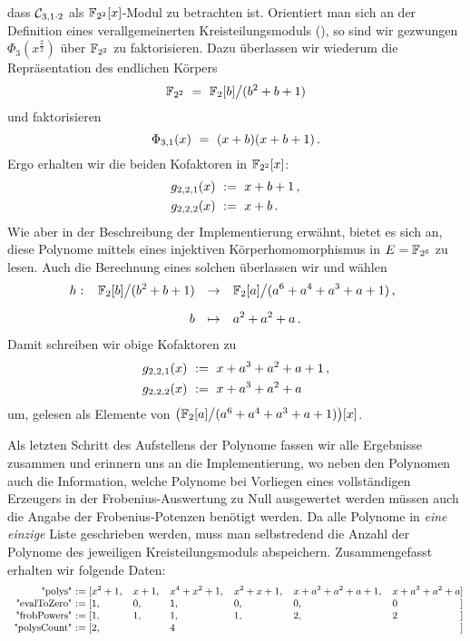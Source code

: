 \begin{enumerate}
\begin{description}
        dass $\mathcal{C}_{3,1\cdot 2}$ als $\mathbb{F}_{2^2}[x]$-Modul zu betrachten
        ist. Orientiert man sich an der Definition eines verallgemeinerten
        Kreisteilungsmoduls (),
        so sind wir gezwungen $\Phi_3(x^{\frac{2}{2}})$ über $\mathbb{F}_{2^2}$ zu
        faktorisieren. Dazu überlassen wir wiederum \sage die Repräsentation
        des endlichen Körpers
        \[ \mathbb{F}_{2^2} \ =\  \mathbb{F}_2[b] \big/ (b^2+b+1)\]
        und faktorisieren
        \[ \Phi_{3,1}(x) \ =\  (x+b) (x+b+1)\,. \]
        Ergo erhalten wir die beiden Kofaktoren in $\mathbb{F}_{2^2}[x]$:
        \begin{align*}
          g_{2,2,1}(x) &\ :=\  x + b+1\,,\\
          g_{2,2,2}(x) &\ :=\  x + b\,.
        \end{align*}
        Wie aber in der Beschreibung der Implementierung erwähnt, bietet es
        sich an, diese Polynome mittels eines injektiven Körperhomomorphismus
        in $E = \mathbb{F}_{2^6}$ zu lesen. Auch die Berechnung eines solchen
        überlassen wir \sage und wählen
        \[ h:\ \funcdef{\F_2[b]\big/(b^2+b+1) &\to& 
          \F_2[a] \big/ ( a^6 + a^4 + a^3 + a + 1 )\,,\\[10pt]
          b &\mapsto& a^2+a^2+a\,.}\]
        Damit schreiben wir obige Kofaktoren zu
        \begin{align*}
          g_{2,2,1}(x) &\ :=\  x + a^3+a^2+a+1\,,\\
          g_{2,2,2}(x) &\ :=\  x + a^3+a^2+a
        \end{align*}
        um, gelesen als Elemente von $\big(\mathbb{F}_2[a]\big/(a^6+a^4+a^3+a+1)\big)[x]$.
    \end{description}
\end{enumerate}
Als letzten Schritt des Aufstellens der Polynome fassen wir alle Ergebnisse
zusammen und erinnern uns an die Implementierung, wo neben den Polynomen auch
die Information, welche Polynome bei Vorliegen eines vollständigen Erzeugers in
der Frobenius-Auswertung zu Null ausgewertet werden müssen auch die Angabe der
Frobenius-Potenzen benötigt werden. Da alle Polynome in \emph{eine einzige}
Liste geschrieben werden, muss man selbstredend die Anzahl der Polynome des
jeweiligen Kreisteilungsmoduls abspeichern. Zusammengefasst erhalten wir
folgende Daten:
\[\small\begin{array}{r@{\ := [}llllll@{]}}
    \text{"polys"} &  x^2+1,& x+1, & x^4+x^2+1, &x^2+x+1, 
      & x+a^3+a^2+a+1, & x+a^3+a^2+a\\
    \text{"evalToZero"} & 1, & 0, & 1, & 0, & 0, & 0\\
    \text{"frobPowers"} & 1, & 1, & 1, & 1, & 2, & 2\\
    \text{"polysCount"} & 2, &    & 4  &    &    &\\
  \end{array}\]

